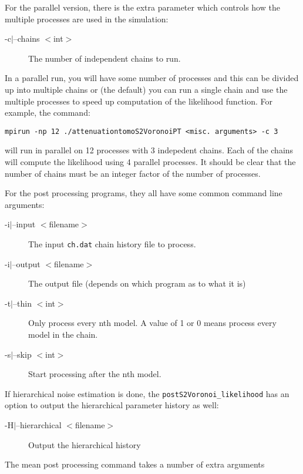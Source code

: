 \documentclass{article}
\begin{document}
For the parallel version, there is the extra parameter which controls how the multiple
processes are used in the simulation:

\begin{description}
\item [-c$|$--chains $<$int$>$] The number of independent chains to run.
\end{description}

In a parallel run, you will have some number of processes and this can be divided up
into multiple chains or (the default) you can run a single chain and use the
multiple processes to speed up computation of the likelihood function. For example,
the command:

\begin{verbatim}
mpirun -np 12 ./attenuationtomoS2VoronoiPT <misc. arguments> -c 3
\end{verbatim}

will run in parallel on 12 processes with 3 indepedent chains. Each of the chains
will compute the likelihood using 4 parallel processes. It should be clear that
the number of chains must be an integer factor of the number of processes.

For the post processing programs, they all have some common command line arguments:

\begin{description}
\item[-i$|$--input $<$filename$>$] The input {\tt ch.dat} chain history file to process.
\item[-i$|$--output $<$filename$>$] The output file (depends on which program as to what it is)
\item[-t$|$--thin $<$int$>$] Only process every nth model. A value of 1 or 0 means process every
  model in the chain.
\item[-s$|$--skip $<$int$>$] Start processing after the nth model.
\end{description}

If hierarchical noise estimation is done, the {\tt postS2Voronoi\_likelihood} has an option
to output the hierarchical parameter history as well:

\begin{description}
\item[-H$|$--hierarchical $<$filename$>$] Output the hierarchical history
\end{description}

The mean post processing command takes a number of extra arguments
\end{document}
